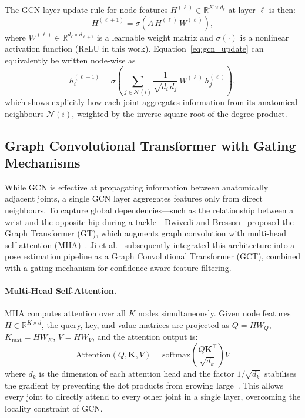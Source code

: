 \documentclass{article}
\begin{document}
The GCN layer update rule for node features
$H^{(\ell)} \in \mathbb{R}^{K \times d_\ell}$ at layer $\ell$ is then:
\begin{equation}
  H^{(\ell+1)} = \sigma\!\left(\tilde{A}\,H^{(\ell)}\,W^{(\ell)}\right),
  \label{eq:gcn_update}
\end{equation}
where $W^{(\ell)} \in \mathbb{R}^{d_\ell \times d_{\ell+1}}$ is a
learnable weight matrix and $\sigma(\cdot)$ is a nonlinear activation
function (ReLU in this work).
Equation~\eqref{eq:gcn_update} can equivalently be written node-wise as
\begin{equation}
  h_i^{(\ell+1)} = \sigma\!\left(
    \sum_{j \in \mathcal{N}(i)} \frac{1}{\sqrt{d_i\, d_j}}\,
    W^{(\ell)}\, h_j^{(\ell)}
  \right),
  \label{eq:gcn_nodewise}
\end{equation}
which shows explicitly how each joint aggregates information from its
anatomical neighbours $\mathcal{N}(i)$, weighted by the inverse square
root of the degree product.

\subsection{Graph Convolutional Transformer with Gating Mechanisms}
\label{sec:lit:gct}

While GCN is effective at propagating information between anatomically adjacent
joints, a single GCN layer aggregates features only from direct neighbours.
To capture global dependencies---such as the relationship between a wrist and
the opposite hip during a tackle---Dwivedi and Bresson~\cite{dwivedi2021graphtransformer}
proposed the Graph Transformer (GT), which augments graph convolution with
multi-head self-attention (MHA)~\cite{vaswani2017attention}.
Ji et al.~\cite{ji2025gct} subsequently integrated this architecture into a
pose estimation pipeline as a Graph Convolutional Transformer (GCT), combined
with a gating mechanism for confidence-aware feature filtering.

\paragraph{Multi-Head Self-Attention.}
MHA computes attention over all $K$ nodes simultaneously.
Given node features $H \in \mathbb{R}^{K \times d}$, the query, key, and
value matrices are projected as
$Q = H W_Q$, $K_{\text{mat}} = H W_K$, $V = H W_V$, and the
attention output is:
\begin{equation}
  \text{Attention}(Q, \mathbf{K}, V) = \text{softmax}\left(\frac{Q\mathbf{K}^\top}{\sqrt{d_k}}\right)V
  \label{eq:mha}
\end{equation}
where $d_k$ is the dimension of each attention head and the factor
$1/\!\sqrt{d_k}$ stabilises the gradient by preventing the dot products from
growing large~\cite{vaswani2017attention}.
This allows every joint to directly attend to every other joint in a single
layer, overcoming the locality constraint of GCN.
\end{document}
